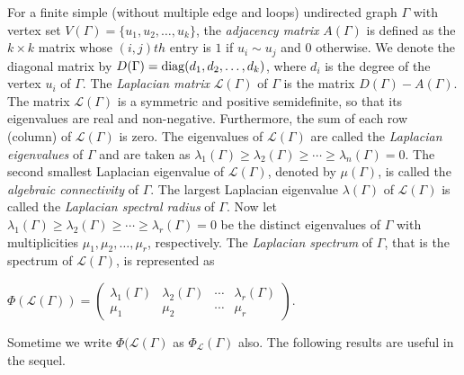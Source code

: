 \documentclass{amsart}
\theoremstyle{plain}
\theoremstyle{definition}
\theoremstyle{remark}
\begin{document}
For a finite simple (without multiple edge and loops) undirected graph $\Gamma$ with vertex set $V(\Gamma) = \{u_1, u_2, \ldots, u_k\}$, the \emph{adjacency matrix} $A(\Gamma)$ is defined as the $k\times k$ matrix whose $(i, j)th$ entry is $1$ if $u_i \sim u_j$ and $0$ otherwise. We denote the diagonal matrix by $D(\Gamma) = {\rm diag}(d_1, d_2, \ldots, d_k)$, where $d_i$ is the degree of the vertex $u_i$ of $\Gamma$. The \emph{Laplacian matrix} $\mathcal{L}(\Gamma)$ of $\Gamma$ is the matrix $D(\Gamma) - A(\Gamma)$. The matrix $\mathcal{L}(\Gamma)$ is  a symmetric and positive semidefinite, so that its eigenvalues are real and non-negative. Furthermore, the sum of each row (column) of $\mathcal{L}(\Gamma)$ is zero. %
 The eigenvalues of $\mathcal{L}(\Gamma)$ are called the \emph{Laplacian eigenvalues} of $\Gamma$ and are taken as  $\lambda_1(\Gamma) \geq \lambda_2(\Gamma) \geq \cdots \geq \lambda_n(\Gamma) = 0$. The second smallest Laplacian eigenvalue of $\mathcal{L}(\Gamma)$, denoted by $\mu(\Gamma)$, is called the \emph{algebraic connectivity} of $\Gamma$. The largest Laplacian eigenvalue $\lambda(\Gamma)$ of $\mathcal{L}(\Gamma)$ is called the \emph{Laplacian spectral radius} of $\Gamma$. Now let $\lambda_{1}(\Gamma) \geq \lambda_{2}(\Gamma) \geq \cdots \geq \lambda_{r}(\Gamma) = 0$ be the distinct eigenvalues of $\Gamma$ with multiplicities $\mu_1, \mu_2, \ldots, \mu_r$, respectively. The \emph{Laplacian spectrum} of $\Gamma$, that is the spectrum  of $\mathcal{L}(\Gamma)$, is represented as
 \begin{center}
$\displaystyle \Phi(\mathcal{L}(\Gamma)) = \begin{pmatrix}
\lambda_{1}(\Gamma) & \lambda_{2}(\Gamma) & \cdots& \lambda_{r}(\Gamma)\\
 \mu_1 & \mu_2 & \cdots & \mu_r
\end{pmatrix}$. 
\end{center}
Sometime we write $\Phi(\mathcal{L}(\Gamma)$  as $\Phi_{\mathcal{L}}(\Gamma)$ also. The following results are useful in the sequel.
\end{document}
